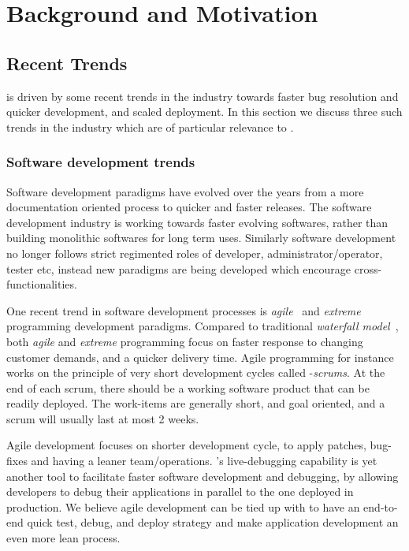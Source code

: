 \chapter{Background and Motivation}
\label{section:background}

\section{Recent Trends}

\parikshan is driven by some recent trends in the industry towards faster bug resolution and quicker development, and scaled deployment.
In this section we discuss three such trends in the industry which are of particular relevance to \parikshan.

\subsection{Software development trends}

Software development paradigms have evolved over the years from a more documentation oriented process to quicker and faster releases. The software development industry is working towards faster evolving softwares, rather than building monolithic softwares for long term uses.
Similarly software development no longer follows strict regimented roles of developer, administrator/operator, tester etc, instead new paradigms are being developed which encourage cross-functionalities.

One recent trend in software development processes is \emph{agile}~\cite{agile} and \emph{extreme}~\cite{extremeProgramming} programming development paradigms. Compared to traditional \emph{waterfall model}~\cite{waterfall}, both \emph{agile} and \emph{extreme} programming focus on faster response to changing customer demands, and a quicker delivery time. Agile programming for instance works on the principle of very short development cycles called -\emph{scrums}. At the end of each scrum, there should be a working software product that can be readily deployed. The work-items are generally short, and goal oriented, and a scrum will usually last at most 2 weeks. 

Agile development focuses on shorter development cycle, to apply patches, bug-fixes and having a leaner team/operations.
\parikshan's live-debugging capability is yet another tool to facilitate faster software development and debugging, by allowing developers to debug their applications in parallel to the one deployed in production.
We believe agile development can be tied up with \parikshan to have an end-to-end quick test, debug, and deploy strategy and make application development an even more lean process.

